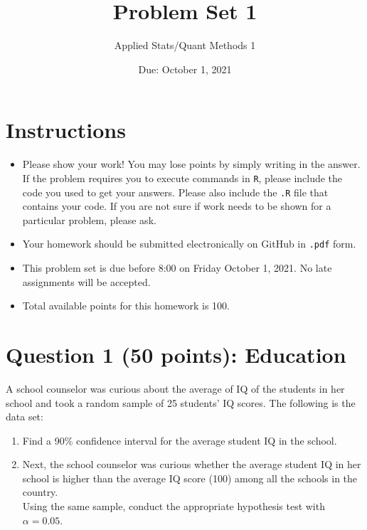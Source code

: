 \documentclass[12pt,letterpaper]{article}
\title{Problem Set 1}
\date{Due: October 1, 2021}
\author{Applied Stats/Quant Methods 1}
\begin{document}
	\maketitle
	
	\section*{Instructions}
	\begin{itemize}
		\item Please show your work! You may lose points by simply writing in the answer. If the problem requires you to execute commands in \texttt{R}, please include the code you used to get your answers. Please also include the \texttt{.R} file that contains your code. If you are not sure if work needs to be shown for a particular problem, please ask.
		\item Your homework should be submitted electronically on GitHub in \texttt{.pdf} form.
		\item This problem set is due before 8:00 on Friday October 1, 2021. No late assignments will be accepted.
		\item Total available points for this homework is 100.
	\end{itemize}
	
	\vspace{1cm}
	\section*{Question 1 (50 points): Education}

A school counselor was curious about the average of IQ of the students in her school and took a random sample of 25 students' IQ scores. The following is the data set:\\
\vspace{.5cm}

  

\vspace{1cm}

\begin{enumerate}
	\item Find a 90\% confidence interval for the average student IQ in the school.\\
	
	\item Next, the school counselor was curious  whether  the average student IQ in her school is higher than the average IQ score (100) among all the schools in the country.\\ 
	
	\noindent Using the same sample, conduct the appropriate hypothesis test with $\alpha=0.05$.
\end{enumerate}
\end{document}
